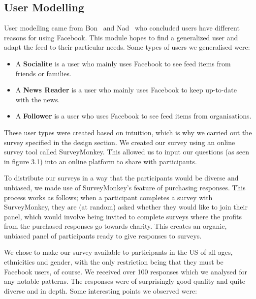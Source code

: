 \subsection{User Modelling}
User modelling came from Bon~\cite{bonds2010myspace} and Nad~\cite{nadkarni2012people} who concluded users have different reasons for using Facebook. This module hopes to find a generalized user and adapt the feed to their particular needs. Some types of users we generalised were:

\begin{itemize}
	\item A \textbf{Socialite} is a user who mainly uses Facebook to see feed items from friends or families.
	\item A \textbf{News Reader} is a user who mainly uses Facebook to keep up-to-date with the news.
	\item A \textbf{Follower} is a user who uses Facebook to see feed items from organisations.
\end{itemize}

These user types were created based on intuition, which is why we carried out the survey specified in the design section. We created our survey using an online survey tool called SurveyMonkey. This allowed us to input our questions (as seen in figure 3.1) into an online platform to share with participants.

To distribute our surveys in a way that the participants would be diverse and unbiased, we made use of SurveyMonkey’s feature of purchasing responses. This process works as follows; when a participant completes a survey with SurveyMonkey, they are (at random) asked whether they would like to join their panel, which would involve being invited to complete surveys where the profits from the purchased responses go towards charity. This creates an organic, unbiased panel of participants ready to give responses to surveys.

We chose to make our survey available to participants in the US of all ages, ethnicities and gender, with the only restriction being that they must be Facebook users, of course.
We received over 100 responses which we analysed for any notable patterns. The responses were of surprisingly good quality and quite diverse and in depth. Some interesting points we observed were:

